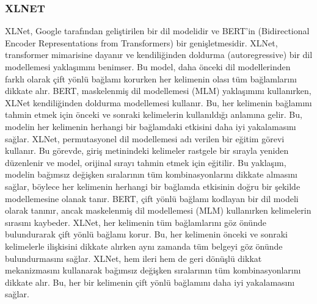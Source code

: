 \subsubsection{XLNET}
XLNet, Google tarafından geliştirilen bir dil modelidir ve BERT'in (Bidirectional Encoder Representations from Transformers) bir genişletmesidir. XLNet, transformer mimarisine dayanır ve kendiliğinden doldurma (autoregressive) bir dil modellemesi yaklaşımını benimser. Bu model, daha önceki dil modellerinden farklı olarak çift yönlü bağlamı korurken her kelimenin olası tüm bağlamlarını dikkate alır. BERT, maskelenmiş dil modellemesi (MLM) yaklaşımını kullanırken, XLNet kendiliğinden doldurma modellemesi kullanır. Bu, her kelimenin bağlamını tahmin etmek için önceki ve sonraki kelimelerin kullanıldığı anlamına gelir. Bu, modelin her kelimenin herhangi bir bağlamdaki etkisini daha iyi yakalamasını sağlar. XLNet, permutasyonel dil modellemesi adı verilen bir eğitim görevi kullanır. Bu görevde, giriş metinindeki kelimeler rastgele bir sırayla yeniden düzenlenir ve model, orijinal sırayı tahmin etmek için eğitilir. Bu yaklaşım, modelin bağımsız değişken sıralarının tüm kombinasyonlarını dikkate almasını sağlar, böylece her kelimenin herhangi bir bağlamda etkisinin doğru bir şekilde modellemesine olanak tanır. BERT, çift yönlü bağlamı kodlayan bir dil modeli olarak tanınır, ancak maskelenmiş dil modellemesi (MLM) kullanırken kelimelerin sırasını kaybeder. XLNet, her kelimenin tüm bağlamlarını göz önünde bulundurarak çift yönlü bağlamı korur. Bu, her kelimenin önceki ve sonraki kelimelerle ilişkisini dikkate alırken aynı zamanda tüm belgeyi göz önünde bulundurmasını sağlar. XLNet, hem ileri hem de geri dönüşlü dikkat mekanizmasını kullanarak bağımsız değişken sıralarının tüm kombinasyonlarını dikkate alır. Bu, her bir kelimenin çift yönlü bağlamını daha iyi yakalamasını sağlar.
 
\newpage